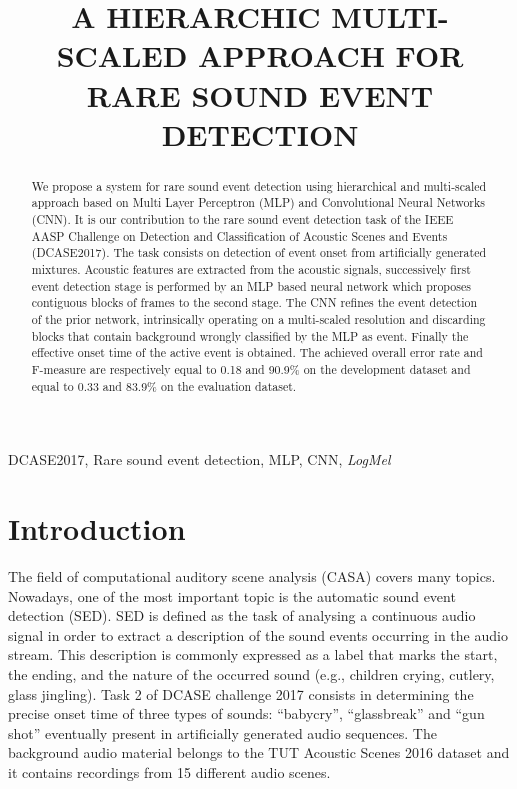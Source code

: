 \documentclass{article}
\title{A HIERARCHIC MULTI-SCALED APPROACH FOR RARE SOUND EVENT DETECTION}
\begin{document}
\ninept
\maketitle

\begin{sloppy}

\begin{abstract}
We propose a system for rare sound event detection using hierarchical and multi-scaled approach based on Multi Layer Perceptron (MLP) and Convolutional Neural Networks (CNN). 
It is our contribution to the rare sound event detection task of the IEEE AASP Challenge on  Detection and Classification of Acoustic Scenes and Events (DCASE2017). The task consists on detection of event onset from artificially generated mixtures. Acoustic features are extracted from the acoustic signals, successively first event detection stage is performed by an MLP based neural network which proposes contiguous blocks of frames to the second stage. The CNN refines the event detection of the prior network, intrinsically operating on a multi-scaled resolution and discarding blocks that contain background wrongly classified by the MLP as event. Finally the effective onset time of the active event is obtained.
The achieved overall error rate and F-measure are respectively equal to 0.18 and 90.9\% on the development dataset and equal to 0.33 and 83.9\% on the evaluation dataset.	
\end{abstract}

\begin{keywords}
DCASE2017, Rare sound event detection, MLP, CNN, \textit{LogMel}
\end{keywords}


\section{Introduction}
\label{sec:intro}


The field of computational auditory scene analysis (CASA) covers many topics. 
Nowadays, one of the most important topic is the automatic sound event detection (SED). 
SED is defined as the task of analysing a continuous audio signal in order to extract a description of the sound events occurring in the audio stream. This description is commonly expressed as a label that marks the start, the ending, and the nature of the occurred sound (e.g., children crying, cutlery, glass jingling).
Task 2 of DCASE challenge 2017 \cite{dcase2017web} consists in determining the precise onset time of three types of sounds: ``babycry'', ``glassbreak'' and ``gun shot'' eventually present in artificially generated audio sequences. The background audio material belongs to the TUT Acoustic Scenes 2016 dataset and it contains recordings from 15 different audio scenes.


\end{sloppy}
\end{document}
